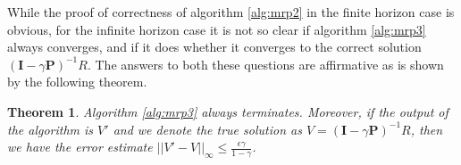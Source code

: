 \documentclass{article}
\newtheorem{theorem}{Theorem}[section]
\theoremstyle{definition}
\theoremstyle{remark}
\begin{document}
While the proof of correctness of algorithm \ref{alg:mrp2} in the finite horizon case is obvious, for the infinite horizon case it is not so clear if algorithm \ref{alg:mrp3} always converges, and if it does whether it converges to the correct solution $(\mathbf{I} - \gamma \mathbf{P})^{-1}R$. The answers to both these questions are affirmative as is shown by the following theorem.

\begin{theorem}
Algorithm \ref{alg:mrp3} always terminates. Moreover, if the output of the algorithm is $V'$ and we denote the true solution as $V = (\mathbf{I} - \gamma \mathbf{P})^{-1}R$, then we have the error estimate $||V' - V||_{\infty} \leq \frac{\epsilon \gamma}{1 - \gamma}$.
\label{th-mrp3-termination}
\end{theorem}
\end{document}
